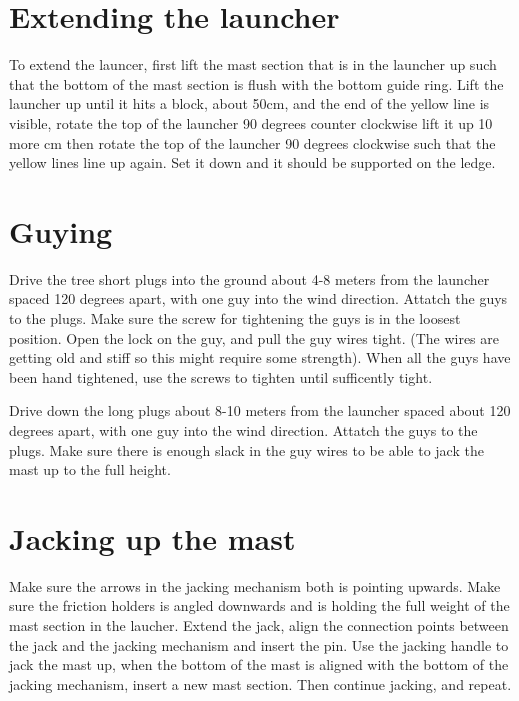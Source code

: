 \documentclass{article}
\begin{document}
\section{Extending the launcher}
To extend the launcer, first lift the mast section that is in the launcher up such that the bottom of the mast section is flush with the bottom guide ring. Lift the launcher up until it hits a block, about 50cm, and the end of the yellow line is visible, rotate the top of the launcher 90 degrees counter clockwise lift it up 10 more cm then rotate the top of the launcher 90 degrees clockwise such that the yellow lines line up again. Set it down and it should be supported on the ledge.


\section{Guying}
Drive the tree short plugs into the ground about 4-8 meters from the launcher spaced 120 degrees apart, with one guy into the wind direction. Attatch the guys to the plugs. Make sure the screw for tightening the guys is in the loosest position. Open the lock on the guy, and pull the guy wires tight. (The wires are getting old and stiff so this might require some strength). When all the guys have been hand tightened, use the screws to tighten until sufficently tight.

Drive down the long plugs about 8-10 meters from the launcher spaced about 120 degrees apart, with one guy into the wind direction. Attatch the guys to the plugs. Make sure there is enough slack in the guy wires to be able to jack the mast up to the full height.

\section{Jacking up the mast}
Make sure the arrows in the jacking mechanism both is pointing upwards.
Make sure the friction holders is angled downwards and is holding the full weight of the mast section in the laucher.
Extend the jack, align the connection points between the jack and the jacking mechanism and insert the pin.
Use the jacking handle to jack the mast up, when the bottom of the mast is aligned with the bottom of the jacking mechanism, insert a new mast section. Then continue jacking, and repeat.
\end{document}
